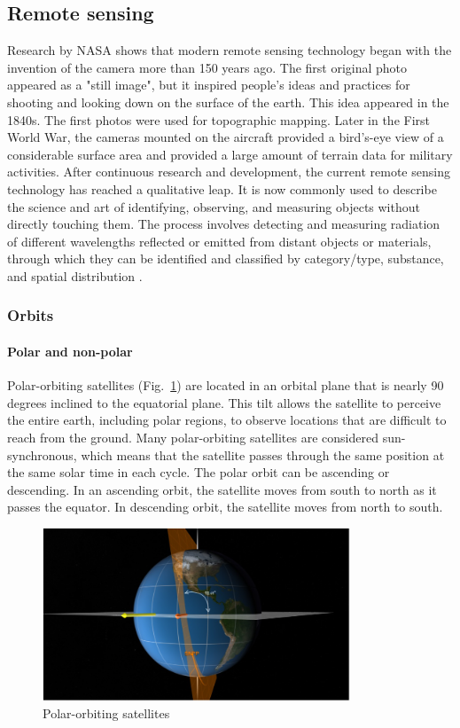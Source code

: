 \documentclass[conference]{IEEEtran}
\begin{document}
\subsection{Remote sensing}
Research by NASA shows that modern remote sensing technology began with the invention of the camera more than 150 years ago. The 
first original photo appeared as a "still image", but it inspired people's ideas and practices for shooting and looking down on 
the surface of the earth. This idea appeared in the 1840s. The first photos were used for topographic mapping. Later in the First 
World War, the cameras mounted on the aircraft provided a bird's-eye view of a considerable surface area and provided a large amount 
of terrain data for military activities. After continuous research and development, the current remote sensing technology has reached 
a qualitative leap. It is now commonly used to describe the science and art of identifying, observing, and measuring objects without 
directly touching them. The process involves detecting and measuring radiation of different wavelengths reflected or emitted from distant 
objects or materials, through which they can be identified and classified by category/type, substance, and spatial distribution \cite{earthdata28:online}.

\subsubsection{Orbits} 
    
\paragraph{Polar and non-polar}
    
Polar-orbiting satellites (Fig.~\ref{satellites}) are located in an orbital plane that is nearly 90 degrees inclined to the equatorial 
plane. This tilt allows the satellite to perceive the entire earth, including polar regions, to observe locations that are difficult 
to reach from the ground. Many polar-orbiting satellites are considered sun-synchronous, which means that the satellite passes through 
the same position at the same solar time in each cycle. The polar orbit can be ascending or descending. In an ascending orbit, the satellite 
moves from south to north as it passes the equator. In descending orbit, the satellite moves from north to south.

\begin{figure}[htbp]
    \centerline{\includegraphics[width=260pt]{images/1.1.1.png}}
    \caption{Polar-orbiting satellites}
    \label{satellites}
\end{figure}
 
\end{document}
